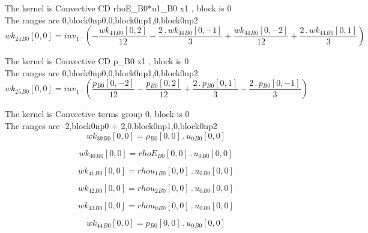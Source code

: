 \documentclass{article}
\begin{document}
\noindent The kernel is Convective CD rhoE_B0*u1_B0 x1 , block is 0\\\noindent The ranges are 0,block0np0,0,block0np1,0,block0np2\\\begin{dmath}{wk_{24}{_{B0}}}[{0,0}] = inv_1 \,.\, \left(- \frac{{wk_{44}{_{B0}}}[{0,2}]}{12} - \frac{2 \,.\, {wk_{44}{_{B0}}}[{0,-1}]}{3} + \frac{{wk_{44}{_{B0}}}[{0,-2}]}{12} + \frac{2 \,.\, {wk_{44}{_{B0}}}[{0,1}]}{3}\right)\end{dmath}

\noindent The kernel is Convective CD p_B0 x1 , block is 0\\\noindent The ranges are 0,block0np0,0,block0np1,0,block0np2\\\begin{dmath}{wk_{25}{_{B0}}}[{0,0}] = inv_1 \,.\, \left(\frac{{p{_{B0}}}[{0,-2}]}{12} - \frac{{p{_{B0}}}[{0,2}]}{12} + \frac{2 \,.\, {p{_{B0}}}[{0,1}]}{3} - \frac{2 \,.\, {p{_{B0}}}[{0,-1}]}{3}\right)\end{dmath}

\noindent The kernel is Convective terms group 0, block is 0\\\noindent The ranges are -2,block0np0 + 2,0,block0np1,0,block0np2\\\begin{dmath}{wk_{39}{_{B0}}}[{0,0}] = {\rho{_{B0}}}[{0,0}] \,.\, {u_{0}{_{B0}}}[{0,0}]\end{dmath}

\begin{dmath}{wk_{40}{_{B0}}}[{0,0}] = {rhoE{_{B0}}}[{0,0}] \,.\, {u_{0}{_{B0}}}[{0,0}]\end{dmath}

\begin{dmath}{wk_{41}{_{B0}}}[{0,0}] = {rhou_{1}{_{B0}}}[{0,0}] \,.\, {u_{0}{_{B0}}}[{0,0}]\end{dmath}

\begin{dmath}{wk_{42}{_{B0}}}[{0,0}] = {rhou_{2}{_{B0}}}[{0,0}] \,.\, {u_{0}{_{B0}}}[{0,0}]\end{dmath}

\begin{dmath}{wk_{43}{_{B0}}}[{0,0}] = {rhou_{0}{_{B0}}}[{0,0}] \,.\, {u_{0}{_{B0}}}[{0,0}]\end{dmath}

\begin{dmath}{wk_{44}{_{B0}}}[{0,0}] = {p{_{B0}}}[{0,0}] \,.\, {u_{0}{_{B0}}}[{0,0}]\end{dmath}
\end{document}
